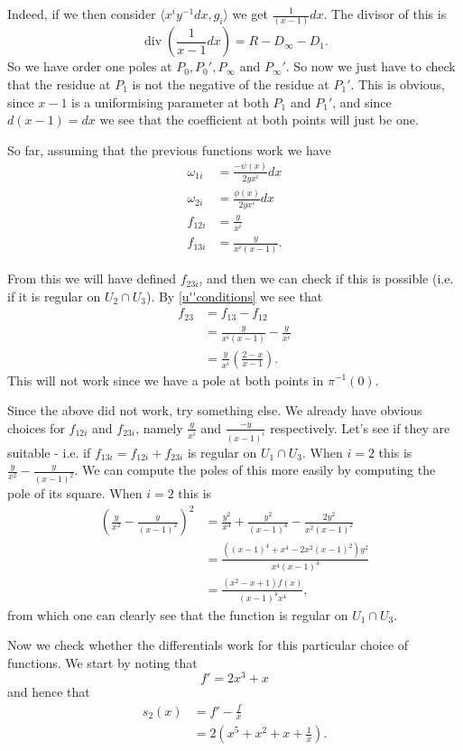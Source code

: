 \documentclass[draft, 11pt]{article} %
\theoremstyle{plain}
\theoremstyle{remark}
\DeclareMathOperator{\di}{div}
\begin{document}
Indeed, if we then consider $\langle x^iy^{-1}dx, g_i \rangle$ we get $\frac{1}{(x-1)}dx$.
The divisor of this is
\[
\di \left( \frac{1}{x-1}dx \right) = R - D_\infty - D_1.
\]
So we have order one poles at $P_0, P_0', P_\infty$ and $P_\infty'$.
So now we just have to check that the residue at $P_1$ is not the negative of the residue at $P_1'$.
This is obvious, since $x-1$ is a uniformising parameter at both $P_1$ and $P_1'$, and since $d(x-1) = dx$ we see that the coefficient at both points will just be one.

So far, assuming that the previous functions work we have
\begin{align*}
\omega_{1i} & = \frac{-\psi(x)}{2yx^i} dx \\
\omega_{2i} & = \frac{\phi(x)}{2yx^i} dx \\
f_{12i} & = \frac{y}{x^i} \\
f_{13i} & = \frac{y}{x^i(x-1)}.
\end{align*}

From this we will have defined $f_{23i}$, and then we can check if this is possible (i.e. if it is regular on $U_2 \cap U_3$).
By \eqref{u''conditions} we see that
\begin{align*}
f_{23} & = f_{13} - f_{12} \\
& = \frac{y}{x^i(x-1)} - \frac{y}{x^i} \\
& = \frac{y}{x^i} \left( \frac{2-x}{x-1} \right).
\end{align*}
This will not work since we have a pole at both points in $ \pi^{-1}(0)$.


Since the above did not work, try something else.
We already have obvious choices for $f_{12i}$ and $f_{23i}$, namely $\frac{y}{x^i}$ and $\frac{-y}{(x-1)^i}$ respectively.
Let's see if they are suitable - i.e. if $f_{13i}=f_{12i} + f_{23i}$ is regular on $U_1 \cap U_3$.
When $i=2$ this is $\frac{y}{x^2} - \frac{y}{(x-1)^2}$.
We can compute the poles of this more easily by computing the pole of its square.
When $i=2$ this is
\begin{align*}
\left( \frac{y}{x^2} - \frac{y}{(x-1)^2} \right)^2 & = \frac{y^2}{x^4} + \frac{y^2}{(x-1)^4} - \frac{2y^2}{x^2(x-1)^2} \\
& = \frac{((x-1)^4 + x^4 - 2x^2(x-1)^2)y^2}{x^4(x-1)^4} \\
& = \frac{(x^2-x+1)f(x)}{(x-1)^4x^4},
\end{align*}
from which one can clearly see that the function is regular on $U_1 \cap U_3$.


Now we check whether the differentials work for this particular choice of functions.
We start by noting that 
\begin{equation*}
f' = 2x^3 + x
\end{equation*}
and hence that
\begin{align*}
s_2(x) & = f' - \frac{f}{x} \\
& = 2\left(x^5 + x^2 + x + \frac{1}{x} \right).
\end{align*}
\end{document}
